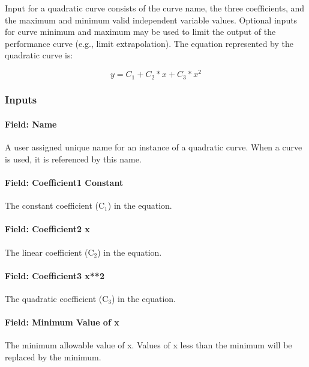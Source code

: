 Input for a quadratic curve consists of the curve name, the three coefficients, and the maximum and minimum valid independent variable values. Optional inputs for curve minimum and maximum may be used to limit the output of the performance curve (e.g., limit extrapolation). The equation represented by the quadratic curve is:

\begin{equation}
y = {C_1} + {C_2}*x + {C_3}*{x^2}
\end{equation}

\subsubsection{Inputs}\label{inputs-2-026}

\paragraph{Field: Name}\label{field-name-2-025}

A user assigned unique name for an instance of a quadratic curve. When a curve is used, it is referenced by this name.

\paragraph{Field: Coefficient1 Constant}\label{field-coefficient1-constant-2}

The constant coefficient (C\(_{1}\)) in the equation.

\paragraph{Field: Coefficient2 x}\label{field-coefficient2-x-1}

The linear coefficient (C\(_{2}\)) in the equation.

\paragraph{Field: Coefficient3 x**2}\label{field-coefficient3-x2}

The quadratic coefficient (C\(_{3}\)) in the equation.

\paragraph{Field: Minimum Value of x}\label{field-minimum-value-of-x-2}

The minimum allowable value of x. Values of x less than the minimum will be replaced by the minimum.

